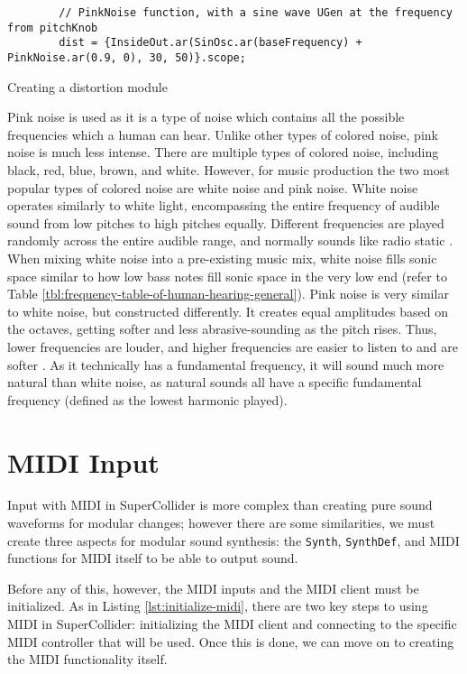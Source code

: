 \begin{listing}
	\begin{lstlisting}
		// PinkNoise function, with a sine wave UGen at the frequency from pitchKnob
		dist = {InsideOut.ar(SinOsc.ar(baseFrequency) + PinkNoise.ar(0.9, 0), 30, 50)}.scope;
	\end{lstlisting}
	\caption{Creating a distortion module}
	\label{lst:distortion-waveforms}
\end{listing}

Pink noise is used as it is a type of noise which contains all the possible frequencies which a human can hear. Unlike other types of colored noise, pink noise is much less intense. There are multiple types of colored noise, including black, red, blue, brown, and white. However, for music production the two most popular types of colored noise are white noise and pink noise. White noise operates similarly to white light, encompassing the entire frequency of audible sound from low pitches to high pitches equally. Different frequencies are played randomly across the entire audible range, and normally sounds like radio static \cite{Unison_2021}. When mixing white noise into a pre-existing music mix, white noise fills sonic space similar to how low bass notes fill sonic space in the very low end (refer to Table \ref{tbl:frequency-table-of-human-hearing-general}). Pink noise is very similar to white noise, but constructed differently. It creates equal amplitudes based on the octaves, getting softer and less abrasive-sounding as the pitch rises. Thus, lower frequencies are louder, and higher frequencies are easier to listen to and are softer \cite{Unison_2021}. As it technically has a fundamental frequency, it will sound much more natural than white noise, as natural sounds all have a specific fundamental frequency (defined as the lowest harmonic played).

\section{MIDI Input}\label{section:midi-input}

Input with MIDI in SuperCollider is more complex than creating pure sound waveforms for modular changes; however there are some similarities, we must create three aspects for modular sound synthesis: the \texttt{Synth}, \texttt{SynthDef}, and MIDI functions for MIDI itself to be able to output sound. 

Before any of this, however, the MIDI inputs and the MIDI client must be initialized. As in Listing \ref{lst:initialize-midi}, there are two key steps to using MIDI in SuperCollider: initializing the MIDI client and connecting to the specific MIDI controller that will be used. Once this is done, we can move on to creating the MIDI functionality itself.

